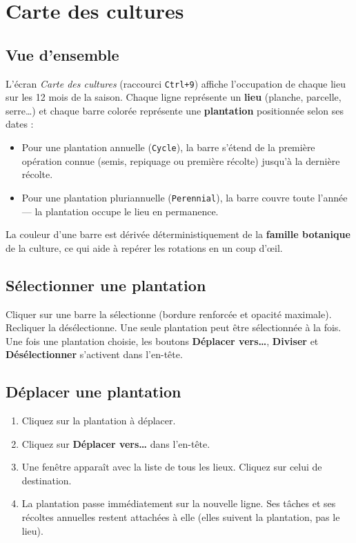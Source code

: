 \chapter{Carte des cultures}
\label{chap:carte}

\section{Vue d'ensemble}

L'écran \emph{Carte des cultures} (raccourci \texttt{Ctrl+9}) affiche l'occupation de chaque lieu sur les 12 mois de la saison. Chaque ligne représente un \textbf{lieu} (planche, parcelle, serre…) et chaque barre colorée représente une \textbf{plantation} positionnée selon ses dates :

\begin{itemize}
  \item Pour une plantation annuelle (\texttt{Cycle}), la barre s'étend de la première opération connue (semis, repiquage ou première récolte) jusqu'à la dernière récolte.
  \item Pour une plantation pluriannuelle (\texttt{Perennial}), la barre couvre toute l'année — la plantation occupe le lieu en permanence.
\end{itemize}

La couleur d'une barre est dérivée déterministiquement de la \textbf{famille botanique} de la culture, ce qui aide à repérer les rotations en un coup d'œil.

\section{Sélectionner une plantation}

Cliquer sur une barre la sélectionne (bordure renforcée et opacité maximale). Recliquer la désélectionne. Une seule plantation peut être sélectionnée à la fois. Une fois une plantation choisie, les boutons \textbf{Déplacer vers…}, \textbf{Diviser} et \textbf{Désélectionner} s'activent dans l'en-tête.

\section{Déplacer une plantation}

\begin{enumerate}
  \item Cliquez sur la plantation à déplacer.
  \item Cliquez sur \textbf{Déplacer vers…} dans l'en-tête.
  \item Une fenêtre apparaît avec la liste de tous les lieux. Cliquez sur celui de destination.
  \item La plantation passe immédiatement sur la nouvelle ligne. Ses tâches et ses récoltes annuelles restent attachées à elle (elles suivent la plantation, pas le lieu).
\end{enumerate}

